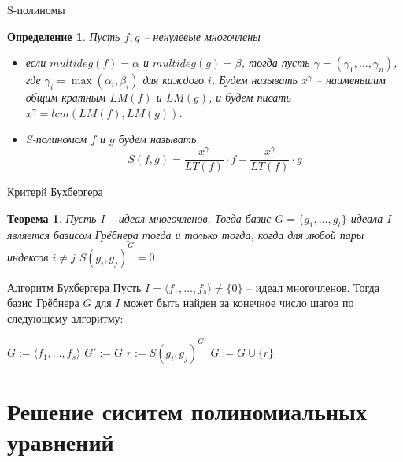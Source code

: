 \documentclass[notheorems,aspectratio=169]{beamer}
\newtheorem{theorem}{Теорема}
\newtheorem{definition}{Определение}
\begin{document}
\begin{frame}{S-полиномы}
    \begin{definition}
    Пусть $f, g$ -- ненулевые многочлены
    \begin{itemize}
        \item [(i)] если $multideg(f) = \alpha$ и $multideg(g) = \beta$, тогда пусть $\gamma = (\gamma_1, \dots, \gamma_n)$, где $\gamma_i = \max(\alpha_i, \beta_i)$ для каждого $i$.
        Будем называть $x^\gamma$ -- наименьшим общим кратным $LM(f)$ и $LM(g)$, и будем писать $x^\gamma = lcm\left(LM(f), LM(g)\right)$.
        \item [(ii)] S-полиномом $f$ и $g$ будем называть
        $$
            S(f, g) = \frac{x^\gamma}{LT(f)}\cdot f - \frac{x^\gamma}{LT(f)}\cdot g
        $$
    \end{itemize}
    \end{definition}
\end{frame}

\begin{frame}{Критерй Бухбергера}
    \begin{theorem}
    Пусть $I$ -- идеал многочленов. Тогда базис 
    $G = \{g_1,\dots, g_t\}$ идеала $I$ является базисом Грёбнера тогда и только тогда, когда для любой пары индексов $i\neq j$  $\overline{S(g_i, g_j)}^G = 0$.
    \end{theorem}
    
    
\end{frame}

\begin{frame}{Алгоритм Бухбергера}
    Пусть $I = \langle f_1,\dots, f_s\rangle \neq \{0\}$ -- идеал многочленов. Тогда базис Грёбнера $G$ для $I$ может быть найден за конечное число шагов по следующему алгоритму:
    \begin{algorithmic}
   \State $G := \langle f_1,\dots, f_s\rangle$
    \Repeat
        \State $G':= G$
            \State $r:= \overline{S(g_i, g_j)}^{G'}$
                \State $G := G \cup \{r\}$
            \EndIf
        \EndFor
    \State {}
    \end{algorithmic}
\end{frame}


\section{Решение сиситем полиномиальных уравнений}
\end{document}
